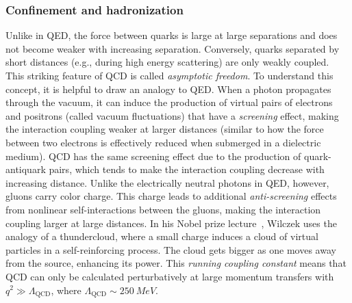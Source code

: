\subsubsection{Confinement and hadronization}
\label{sssec:hadronization}
Unlike in QED, the force between quarks is large at large separations and does
not become weaker with increasing separation. Conversely, quarks separated by
short distances (e.g., during high energy scattering) are only weakly coupled.
This striking feature of QCD is called \emph{asymptotic freedom}. To understand
this concept, it is helpful to draw an analogy to QED. When a photon propagates
through the vacuum, it can induce the production of virtual pairs of electrons
and positrons (called vacuum fluctuations) that have a \emph{screening} effect,
making the interaction coupling weaker at larger distances (similar to how the
force between two electrons is effectively reduced when submerged in a
dielectric medium). QCD has the same screening effect due to the production of
quark-antiquark pairs, which tends to make the interaction coupling decrease
with increasing distance. Unlike the electrically neutral photons in QED,
however, gluons carry color charge. This charge leads to additional
\emph{anti-screening} effects from nonlinear self-interactions between the
gluons, making the interaction coupling larger at large distances. In his Nobel
prize lecture~\cite{RevModPhys.77.857}, Wilczek uses the analogy of a
thundercloud, where a small charge induces a cloud of virtual particles in a
self-reinforcing process. The cloud gets bigger as one moves away from the
source, enhancing its power. This \emph{running coupling constant} means that
QCD can only be calculated perturbatively at large momentum transfers with $q^2
\gg \Lambda_\text{QCD}$, where $\Lambda_\text{QCD} \sim \SI{250}{MeV}$.

